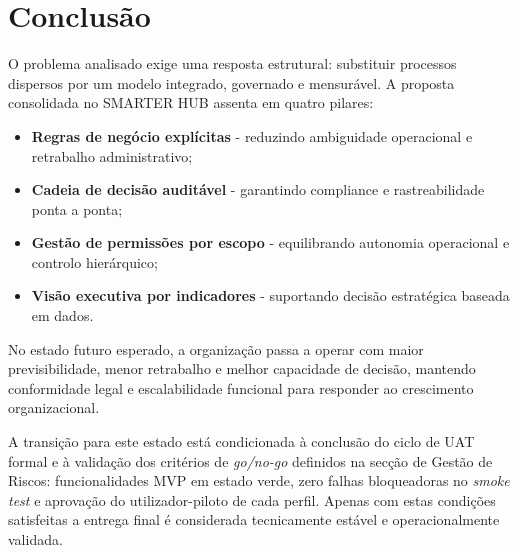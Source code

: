 \documentclass[11pt,a4paper,twoside]{article}
\begin{document}
\section{Conclusão}

O problema analisado exige uma resposta estrutural: substituir processos dispersos por um modelo integrado, governado e mensurável. A proposta consolidada no SMARTER HUB assenta em quatro pilares:

\begin{itemize}
  \item \textbf{Regras de negócio explícitas} - reduzindo ambiguidade operacional e retrabalho administrativo;
  \item \textbf{Cadeia de decisão auditável} - garantindo compliance e rastreabilidade ponta a ponta;
  \item \textbf{Gestão de permissões por escopo} - equilibrando autonomia operacional e controlo hierárquico;
  \item \textbf{Visão executiva por indicadores} - suportando decisão estratégica baseada em dados.
\end{itemize}

No estado futuro esperado, a organização passa a operar com maior previsibilidade, menor retrabalho e melhor capacidade de decisão, mantendo conformidade legal e escalabilidade funcional para responder ao crescimento organizacional.

A transição para este estado está condicionada à conclusão do ciclo de UAT formal e à validação dos critérios de \textit{go/no-go} definidos na secção de Gestão de Riscos: funcionalidades MVP em estado verde, zero falhas bloqueadoras no \textit{smoke test} e aprovação do utilizador-piloto de cada perfil. Apenas com estas condições satisfeitas a entrega final é considerada tecnicamente estável e operacionalmente validada.
\end{document}
